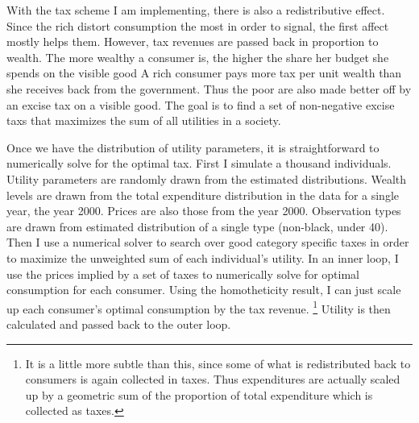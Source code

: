 \documentclass{article}
\begin{document}
With the tax scheme I am implementing, there is also a redistributive effect.
Since the rich distort consumption the most in order to signal, the first affect mostly helps them.
However, tax revenues are passed back in proportion to wealth.
The more wealthy a consumer is, the higher the share her budget she spends on the visible good
A rich consumer pays more tax per unit wealth than she receives back from the government.
Thus the poor are also made better off by an excise tax on a visible good.  
The goal is to find a set of non-negative excise taxs that maximizes the sum of all utilities in a society.

Once we have the distribution of utility parameters, it is straightforward to numerically solve for the optimal tax.
First I simulate a thousand individuals.
Utility parameters are randomly drawn from the estimated distributions.
Wealth levels are drawn from the total expenditure distribution in the data for a single year, the year 2000.
Prices are also those from the year 2000.
Observation types are drawn from estimated distribution of a single type (non-black, under 40).
Then I use a numerical solver to search over good category specific taxes in order to maximize the unweighted sum of each individual's utility.
In an inner loop, I use the prices implied by a set of taxes to numerically solve for optimal consumption for each consumer.
Using the homotheticity result, I can just scale up each consumer's optimal consumption by the tax revenue.
\footnote{It is a little more subtle than this, since some of what is redistributed back to consumers is again collected in taxes.
Thus expenditures are actually scaled up by a geometric sum of the proportion of total expenditure which is collected as taxes. 
}
Utility is then calculated and passed back to the outer loop.
\end{document}
